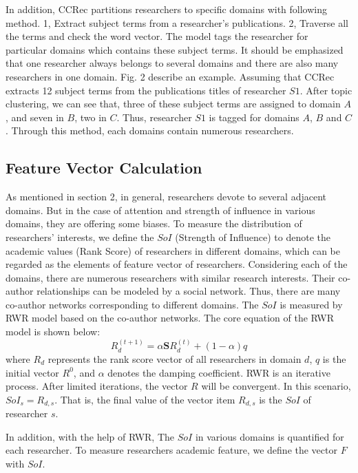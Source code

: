 \documentclass[review]{elsarticle}
\begin{document}
In addition, CCRec partitions researchers to specific domains with following method. 1, Extract subject terms from a researcher's publications. 2, Traverse all the terms and check the word vector. The model tags the researcher for particular domains which contains these subject terms. It should be emphasized that one researcher always belongs to several domains and there are also many researchers in one domain. Fig. 2 describe an example. Assuming that CCRec extracts 12 subject terms from the publications titles of researcher $S1$. After topic clustering, we can see that, three of these subject terms are assigned to domain $A$, and seven in $B$, two in $C$. Thus, researcher $S1$ is tagged for domains $A$, $B$ and $C$. Through this method, each domains contain numerous researchers.

\subsection{Feature Vector Calculation}
As mentioned in section 2, in general, researchers devote to several adjacent domains. But in the case of attention and strength of influence in various domains, they are offering some biases. To measure the distribution of researchers' interests, we define the $SoI$ (Strength of Influence) to denote the academic values (Rank Score) of researchers in different domains, which can be regarded as the elements of feature vector of researchers. Considering each of the domains, there are numerous researchers with similar research interests. Their co-author relationships can be modeled by a social network. Thus, there are many co-author networks corresponding to different domains. The $SoI$ is measured by RWR model based on the co-author networks. The core equation of the RWR model is shown below:
\begin{equation}
R_{d}^{(t+1)}=\alpha \mathbf{S}R_{d}^{(t)}+(1-\alpha)q
\end{equation}
where $R_{d}$ represents the rank score vector of all researchers in domain $d$, $q$ is the initial vector $R^0$, and $\alpha$ denotes the damping coefficient. RWR is an iterative process. After limited iterations, the vector $R$ will be convergent. In this scenario, $SoI_{s}=R_{d,s}$. That is, the final value of the vector item $R_{d,s}$ is the $SoI$ of researcher $s$.


In addition, with the help of RWR, The $SoI$ in various domains is quantified for each researcher. To measure researchers academic feature, we define the vector $F$ with $SoI$.
\end{document}
